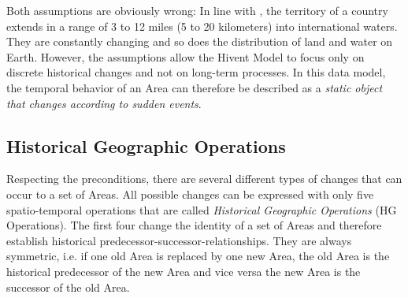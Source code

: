 Both assumptions are obviously wrong: In line with \cite{UNSeaBorders}, the territory of a country extends in a range of 3 to 12 miles (5 to 20 kilometers) into international waters. They are constantly changing and so does the distribution of land and water on Earth. However, the assumptions allow the Hivent Model to focus only on discrete historical changes and not on long-term processes. In this data model, the temporal behavior of an Area can therefore be described as a \emph{static object that changes according to sudden events}.



\subsection{Historical Geographic Operations} %
\label{sub:historical_geographic_operations}

Respecting the preconditions, there are several different types of changes that can occur to a set of Areas. All possible changes can be expressed with only five spatio-temporal operations that are called \emph{Historical Geographic Operations} (HG Operations). The first four change the identity of a set of Areas and therefore establish historical predecessor-successor-relationships. They are always symmetric, i.e. if one old Area is replaced by one new Area, the old Area is the historical predecessor of the new Area and vice versa the new Area is the successor of the old Area.

